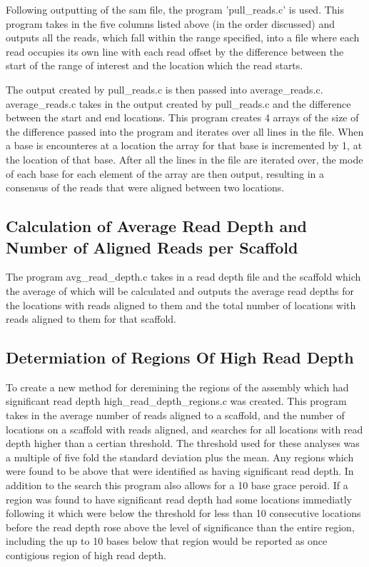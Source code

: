 \documentclass[12pt]{article}
\begin{document}
	Following outputting of the sam file, the program 'pull\_reads.c' is used. This program takes in the five columns listed above (in the order discussed) and outputs all the reads, which fall within the range specified, into a file where each read occupies its own line with each read offset by the difference between the start of the range of interest and the location which the read starts.
	
	The output created by pull\_reads.c is then passed into average\_reads.c. average\_reads.c takes in the output created by pull\_reads.c and the difference between the start and end locations. This program creates 4 arrays of the size of the difference passed into the program and iterates over all lines in the file. When a base is encounteres at a location the array for that base is incremented by 1, at the location of that base. After all the lines in the file are iterated over, the mode of each base for each element of the array are then output, resulting in a consensus of the reads that were aligned between two locations.

\subsection{Calculation of Average Read Depth and Number of Aligned Reads per Scaffold}
	The program avg\_read\_depth.c takes in a read depth file and the scaffold which the average of which will be calculated and outputs the average read depths for the locations with reads aligned to them and the total number of locations with reads aligned to them for that scaffold.

\subsection{Determiation of Regions Of High Read Depth}
	To create a new method for deremining the regions of the assembly which had significant read depth high\_read\_depth\_regions.c was created. This program takes in the average number of reads aligned to a scaffold, and the number of locations on a scaffold with reads aligned, and searches for all locations with read depth higher than a certian threshold. The threshold used for these analyses was a multiple of five fold the standard deviation plus the mean. Any regions which were found to be above that were identified as having significant read depth. In addition to the search this program also allows for a 10 base grace peroid. If a region was found to have significant read depth had some locations immediatly following it which were below the threshold for less than 10 consecutive locations before the read depth rose above the level of significance than the entire region, including the up to 10 bases below that region would be reported as once contigious region of high read depth.
\end{document}
